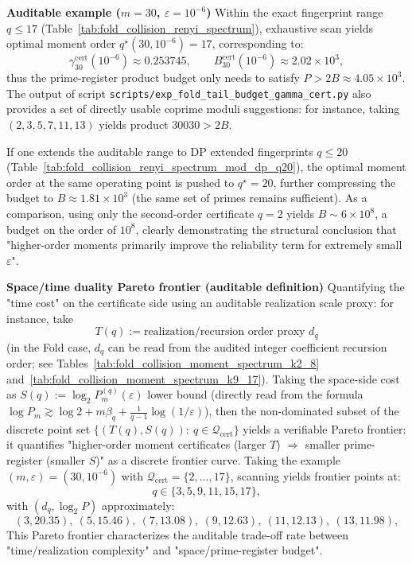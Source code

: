 \begin{remark}
\medskip\noindent\textbf{Auditable example ($m=30$, $\varepsilon=10^{-6}$)}
Within the exact fingerprint range $q\le 17$ (Table~\ref{tab:fold_collision_renyi_spectrum}), exhaustive scan yields optimal moment order $q^\star(30,10^{-6})=17$, corresponding to:
\[
\gamma^{\mathrm{cert}}_{30}(10^{-6})\approx 0.253745,\qquad
B^{\mathrm{cert}}_{30}(10^{-6})\approx 2.02\times 10^3,
\]
thus the prime-register product budget only needs to satisfy $P>2B\approx 4.05\times 10^3$.
The output of script \texttt{scripts/exp\_fold\_tail\_budget\_gamma\_cert.py} also provides a set of directly usable coprime moduli suggestions: for instance, taking $(2,3,5,7,11,13)$ yields product $30030>2B$.
\par
If one extends the auditable range to DP extended fingerprints $q\le 20$ (Table~\ref{tab:fold_collision_renyi_spectrum_mod_dp_q20}), the optimal moment order at the same operating point is pushed to $q^\star=20$, further compressing the budget to $B\approx 1.81\times 10^3$ (the same set of primes remains sufficient).
As a comparison, using only the second-order certificate $q=2$ yields $B\sim 6\times 10^8$, a budget on the order of $10^8$, clearly demonstrating the structural conclusion that "higher-order moments primarily improve the reliability term for extremely small $\varepsilon$".

\medskip\noindent\textbf{Space/time duality Pareto frontier (auditable definition)}
Quantifying the "time cost" on the certificate side using an auditable realization scale proxy: for instance, take
\[
T(q):=\text{realization/recursion order proxy }d_q
\]
(in the Fold case, $d_q$ can be read from the audited integer coefficient recursion order; see Tables~\ref{tab:fold_collision_moment_spectrum_k2_8} and~\ref{tab:fold_collision_moment_spectrum_k9_17}).
Taking the space-side cost as
\(
S(q):=\log_2 P_m^{(q)}(\varepsilon)
\)
lower bound (directly read from the formula $\log P_m\gtrsim \log2+m\beta_q+\frac{1}{q-1}\log(1/\varepsilon)$),
then the non-dominated subset of the discrete point set
\(
\{(T(q),S(q)):\ q\in\mathcal{Q}_{\mathrm{cert}}\}
\)
yields a verifiable Pareto frontier: it quantifies "higher-order moment certificates (larger $T$) $\Rightarrow$ smaller prime-register (smaller $S$)" as a discrete frontier curve.
Taking the example $(m,\varepsilon)=(30,10^{-6})$ with $\mathcal{Q}_{\mathrm{cert}}=\{2,\dots,17\}$, scanning yields frontier points at:
\[
q\in\{3,5,9,11,15,17\},
\]
with $(d_q,\log_2 P)$ approximately:
\[
(3,20.35),\ (5,15.46),\ (7,13.08),\ (9,12.63),\ (11,12.13),\ (13,11.98),
\]
This Pareto frontier characterizes the auditable trade-off rate between "time/realization complexity" and "space/prime-register budget".
\end{remark}

